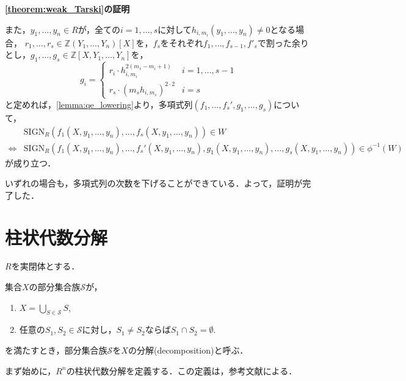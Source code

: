 \documentclass[uplatex, dvipdfmx]{jsarticle}
\makeatletter
\renewenvironment{proof}[1][\proofname]{\par
  \pushQED{\qed}%
  \normalfont \topsep6\p@\@plus6\p@\relax
  \trivlist
  \item\relax
  {\bfseries
  #1\@addpunct{.}}\hspace\labelsep\ignorespaces
}{%
  \popQED\endtrivlist\@endpefalse
}
\newcommand{\Z}{\mathbb{Z}}
\newcommand{\calS}{\mathcal{S}}
\newcommand{\SIGN}{\mathrm{SIGN}}
\theoremstyle{definition}
\renewcommand{\proofname}{\textbf{証明}}
\makeatother
\begin{document}
\begin{proof}[\cref{theorem:weak_Tarski}の証明]
     また，$y_1, \dots, y_n \in R$が，全ての$i=1, \dots, s$に対して$h_{i, m_i}(y_1, \dots, y_n) \neq 0$となる場合，
     $r_1, \dots, r_s \in \Z(Y_1, \dots, Y_n)[X]$を，$f_s$をそれぞれ$f_1, \dots, f_{s-1}, f'_s$で割った余りとし，$g_1, \dots, g_s \in \Z[X,Y_1, \dots, Y_n]$を，
     \[
          g_i = \begin{cases}
               r_i \cdot h_{i,m_i}^{2(m_s-m_i+1)} & i=1, \dots, s-1\\
               r_s \cdot (m_s h_{i,m_s})^{2\cdot2} & i=s
          \end{cases}
     \]
     と定めれば，\cref{lemma:qe_lowering}より，多項式列$(f_1, \dots, f_s', g_1, \dots, g_s)$について，
     \begin{align*}
          &\SIGN_R(f_1(X,y_1, \dots, y_n), \dots, f_s(X,y_1, \dots, y_n)) \in W\\
          \iff &\SIGN_R(f_1(X,y_1, \dots, y_n), \dots, f_s'(X,y_1, \dots, y_n),g_1(X,y_1, \dots, y_n), \dots, g_s(X,y_1, \dots, y_n)) \in \phi^{-1}(W)
     \end{align*}
     が成り立つ．

     いずれの場合も，多項式列の次数を下げることができている．よって，証明が完了した．
\end{proof}

\section{柱状代数分解}

$R$を実閉体とする．

集合$X$の部分集合族$\calS$が，
\begin{enumerate}
     \item $X = \bigcup_{S \in \calS} S$,
     \item 任意の$S_1, S_2 \in \calS$に対し，$S_1 \neq S_2$ならば$S_1 \cap S_2 = \emptyset$.
\end{enumerate}
を満たすとき，部分集合族$\calS$を$X$の分解(decomposition)と呼ぶ．

まず始めに，$R^n$の柱状代数分解を定義する．この定義は，参考文献\cite{Basu}による．
\end{document}

